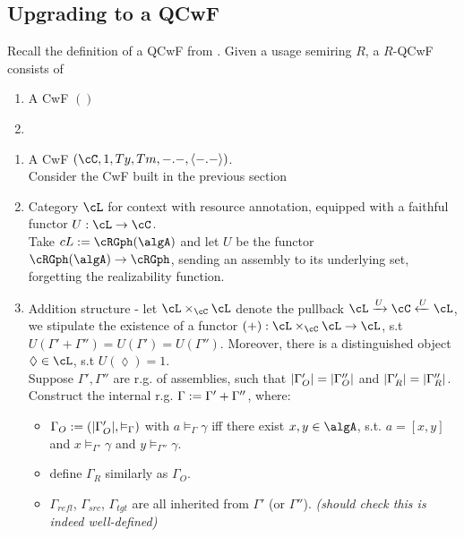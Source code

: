 \documentclass[12pt,a4paper]{article}
\def\src{_{src}}\alwaysmath{src}
\def\rfl{_{refl}}\alwaysmath{rfl}
\def\tgt{_{tgt}}\alwaysmath{tgt}
\renewcommand{\O}{_{O}}\alwaysmath{O}
\def\R{_{R}}\alwaysmath{R}
\begin{document}
\subsection*{Upgrading to a QCwF}
Recall the definition of a QCwF from \cite{fill}.
Given a usage semiring $R$, a $R$-QCwF consists of
\begin{enumerate}[noitemsep]
  \item A CwF $()$
  \item 
\end{enumerate}


\begin{enumerate}[noitemsep]
  \item A CwF $(\cC, 1, Ty, Tm, -.-, \langle-.-\rangle)$.\\
  Consider the CwF built in the previous section
  
  \item Category $\cL$ for context with resource annotation, equipped with a faithful functor $U: \cL \to \cC$.\\
  Take $cL := \cRGph(\algA)$ and let $U$ be the functor $\cRGph(\algA) \to \cRGph$, sending an assembly to its underlying set, forgetting the realizability function.
  
  \item Addition structure - let $\cL \times_\cC \cL$ denote the pullback $\cL \xrightarrow{U} \cC \xleftarrow{U} \cL$, we stipulate the existence of a functor $(+): \cL \times_\cC \cL \to \cL$, s.t $U(\Gamma' + \Gamma'')=U(\Gamma')=U(\Gamma'')$. Moreover, there is a distinguished object $\lozenge \in \cL$, s.t $U(\lozenge) = 1$.\\
  Suppose $\Gamma', \Gamma''$ are r.g. of assemblies, such that $\carr{\Gamma'\O}=\carr{\Gamma''\O}$ and $\carr{\Gamma'\R}=\carr{\Gamma''\R}$. Construct the internal r.g. $\Gamma := \Gamma' + \Gamma''$, where:
  \begin{itemize}[noitemsep]
    \item $\Gamma\O \define (\carr{\Gamma'\O}, \vDash_\Gamma)$ with $ a \vDash_\Gamma \gamma$ iff there exist $x,y \in \algA$, s.t. $a = [x,y]$ and $x \vDash_{\Gamma'} \gamma$ and $ y \vDash_{\Gamma''} \gamma$.
    \item define $\Gamma\R$ similarly as $\Gamma\O$.
    \item $\Gamma\rfl$, $\Gamma\src$, $\Gamma\tgt$ are all inherited from $\Gamma'$ (or $\Gamma''$). \textit{(should check this is indeed well-defined)}\\
    
    

\end{itemize}
\end{enumerate}
\end{document}
